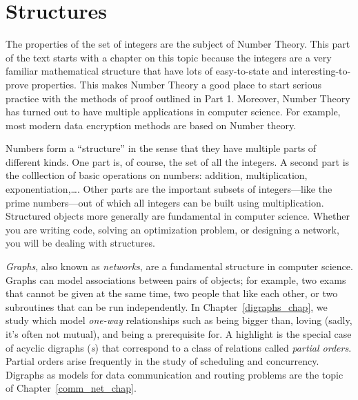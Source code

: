 \part{Structures}
\label{part:structures}

\partintro

The properties of the set of integers are the subject of Number
Theory.  This part of the text starts with a chapter on this topic
because the integers are a very familiar mathematical structure that
have lots of easy-to-state and interesting-to-prove properties.  This
makes Number Theory a good place to start serious practice with the
methods of proof outlined in Part 1.  Moreover, Number Theory has
turned out to have multiple applications in computer science.  For
example, most modern data encryption methods are based on Number
theory.

Numbers form a ``structure'' in the sense that they have multiple
parts of different kinds.  One part is, of course, the set of all the
integers.  A second part is the colllection of basic operations on
numbers: addition, multiplication, exponentiation,\dots.  Other parts
are the important subsets of integers---like the prime numbers---out
of which all integers can be built using multiplication.  Structured
objects more generally are fundamental in computer science.  Whether
you are writing code, solving an optimization problem, or designing a
network, you will be dealing with structures.

\iffalse
  The better
you can understand the structure, the better your results will be.
And if you can reason about structure, then you will be in a good
position to convince others (and yourself) that your results are
worthy.\fi

\emph{Graphs}, also known as \emph{networks}, are a fundamental
structure in computer science.  Graphs can model associations between
pairs of objects; for example, two exams that cannot be given at the
same time, two people that like each other, or two subroutines that
can be run independently.  In Chapter~\ref{digraphs_chap}, we study
\emph{} which model \emph{one-way} relationships
such as being bigger than, loving (sadly, it's often not mutual), and
being a prerequisite for.  A highlight is the special case of acyclic
digraphs (\emph{s}) that correspond to a class of relations
called \emph{partial orders}.  Partial orders arise frequently in the
study of scheduling and concurrency.  Digraphs as models for data
communication and routing problems are the topic of
Chapter~\ref{comm_net_chap}.

